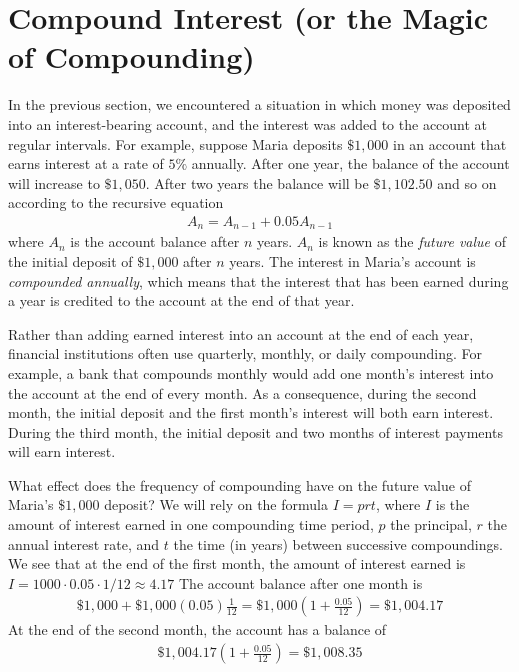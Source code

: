 \documentclass[10pt,]{book}
\theoremstyle{plain}
\theoremstyle{definition}
\theoremstyle{definition}
\theoremstyle{definition}
\numberwithin{equation}{section}
\begin{document}
\section[{Compound Interest (or the Magic of Compounding)}]{Compound Interest (or the Magic of Compounding)}\label{chapter04-section05}
In the previous section, we encountered a situation in which money was deposited into an interest-bearing account, and the interest was added to the account at regular intervals.  For example, suppose Maria deposits \(\$1,000\) in an account that earns interest at a rate of \(5\%\) annually.  After one year, the balance of the account will increase to \(\$1,050\).  After two years the balance will be \(\$1,102.50\) and so on according to the recursive equation%
%
\begin{gather*}
A_n = A_{n-1} + 0.05 A_{n-1}
\end{gather*}
where \(A_n\) is the account balance after \(n\) years. \(A_n\) is known as the \emph{future value} of the initial deposit of \(\$1,000\) after \(n\) years.  The interest in Maria's account is \emph{compounded annually}, which means that the interest that has been earned during a year is credited to the account at the end of that year.%
\par
Rather than adding earned interest into an account at the end of each year, financial institutions often use quarterly, monthly, or daily compounding.  For example, a bank that compounds monthly would add one month's interest into the account at the end of every month. As a consequence, during the second month, the initial deposit and the first month's interest will both earn interest.  During the third month, the initial deposit and two months of interest payments will earn interest.%
\par
What effect does the frequency of compounding have on the future value of Maria's \(\$1,000\) deposit?  We will rely on the formula \(I=prt\), where \(I\) is the amount of interest earned in one compounding time period, \(p\) the principal, \(r\) the annual interest rate, and \(t\) the time (in years) between successive compoundings. We see that at the end of the first month, the amount of interest earned is \(I=1000 \cdot 0.05 \cdot 1/12 \approx 4.17\)  The account balance after one month is%
%
\begin{gather*}
\$1,000 + \$1,000(0.05) \frac{1}{12} = \$1,000 ( 1 + \frac{0.05}{12}) = \$1,004.17
\end{gather*}
At the end of the second month, the account has a balance of%
%
\begin{gather*}
\$1,004.17(1 + \frac{0.05}{12}) = \$1,008.35
\end{gather*}
\end{document}
